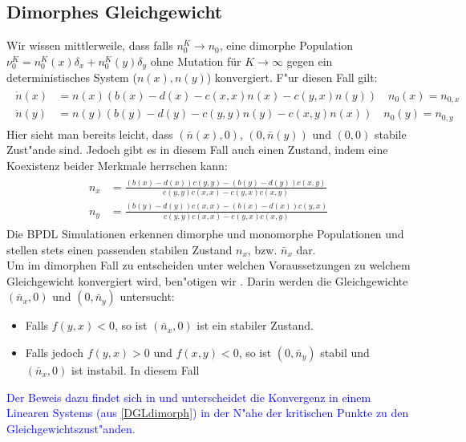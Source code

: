 \documentclass[11pt, a4paper, german]{article}
\theoremstyle{plain}
\begin{document}
	\subsection{Dimorphes Gleichgewicht}
		Wir wissen mittlerweile, dass falls $ n_0^K \to n_0 $, eine dimorphe Population $ \nu_0^K = n_0^K(x) \delta_x + n_0^K(y) \delta_y $ ohne Mutation für $ K \to \infty $ gegen ein deterministisches System ($ n(x), n(y) $) konvergiert. F"ur diesen Fall gilt:
		\begin{align}
		\begin{split}
			\dot{n}(x) & = n(x) (b(x) - d(x) - c(x,x)n(x) - c(y,x) n(y)) \quad n_0(x) = n_{0,x} \\
			\dot{n}(y) & = n(y) (b(y) - d(y) - c(y,y)n(y) - c(x,y) n(x)) \quad n_0(y) = n_{0,y} \label{DGLdimorph}
		\end{split}
		\end{align}
		Hier sieht man bereits leicht, dass $ (\bar{n}(x), 0) $, $ (0, \bar{n}(y)) $ und $ (0,0) $ stabile Zust"ande sind. Jedoch gibt es in diesem Fall auch einen Zustand, indem eine Koexistenz beider Merkmale herrschen kann:
		\begin{align}
		\begin{split}
			n_x &= \frac{(b(x) - d(x))c(y,y)-(b(y)-d(y))c(x,y)}{c(y,y)c(x,x) - c(y,x)c(x,y)}\\
			n_y &= \frac{(b(y) - d(y))c(x,x)-(b(x)-d(x))c(y,x)}{c(y,y)c(x,x) - c(y,x)c(x,y)} \label{GleichgewichtDimorph}
		\end{split}
		\end{align}
		Die BPDL Simulationen erkennen dimorphe und monomorphe Populationen und stellen stets einen passenden stabilen Zustand $ n_x $, bzw. $ \bar{n}_x $ dar. \\
		Um im dimorphen Fall zu entscheiden unter welchen Voraussetzungen zu welchem Gleichgewicht konvergiert wird, ben"otigen wir \cite[Proposition 3]{Champagnat20061127}. Darin werden die Gleichgewichte $ (\bar{n}_x, 0) $ und $ (0, \bar{n}_y) $ untersucht:
		\begin{itemize}
			\item[] Falls $ f(y,x) < 0 $, so ist $ (\bar{n}_x, 0) $ ist ein stabiler Zustand.
			\item[] Falls jedoch $ f(y,x) > 0 $ und $ f(x,y) < 0 $, so ist $ (0, \bar{n}_y) $ stabil und $ (\bar{n}_x, 0) $ ist instabil. In diesem Fall
		\end{itemize}
		\textcolor{blue}{Der Beweis dazu findet sich in \cite{Silke} und unterscheidet die Konvergenz in einem Linearen Systems (aus \ref{DGLdimorph}) in der N"ahe der kritischen Punkte zu den Gleichgewichtszust"anden}.\\
\end{document}
